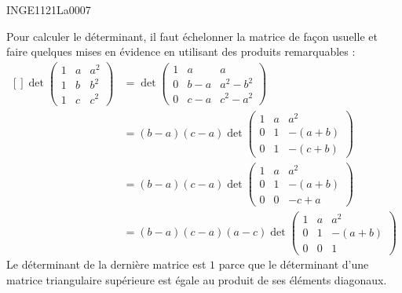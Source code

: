 

\begin{corrige}{INGE1121La0007}

	Pour calculer le déterminant, il faut échelonner la matrice de façon usuelle et faire quelques mises en évidence en utilisant des produits remarquables :
	\begin{equation}
		\begin{aligned}[]
			\det\begin{pmatrix}
				1	&	a	&	a^2	\\
				1	&	b	&	b^2	\\
				1	&	c	&	c^2
			\end{pmatrix}&=
			\det\begin{pmatrix}
				1	&	a	&	a	\\
				0	&	b-a	&	a^2-b^2	\\
				0	&	c-a	&	c^2-a^2
			\end{pmatrix}\\
			&=
			(b-a)(c-a)\det\begin{pmatrix}
				1	&	a	&	a^2	\\
				0	&	1	&	-(a+b)	\\
				0	&	1	&	-(c+b)
			\end{pmatrix}\\
			&=
			(b-a)(c-a)\det\begin{pmatrix}
				1	&	a	&	a^2	\\
				0	&	1	&	-(a+b)	\\
				0	&	0	&	-c+a
			\end{pmatrix}\\
			&=
			(b-a)(c-a)(a-c)\det\begin{pmatrix}
				1	&	a	&	a^2	\\
				0	&	1	&	-(a+b)	\\
				0	&	0	&	1
			\end{pmatrix}
		\end{aligned}
	\end{equation}
	Le déterminant de la dernière matrice est $1$ parce que le déterminant d'une matrice triangulaire supérieure est égale au produit de ses éléments diagonaux.

\end{corrige}
